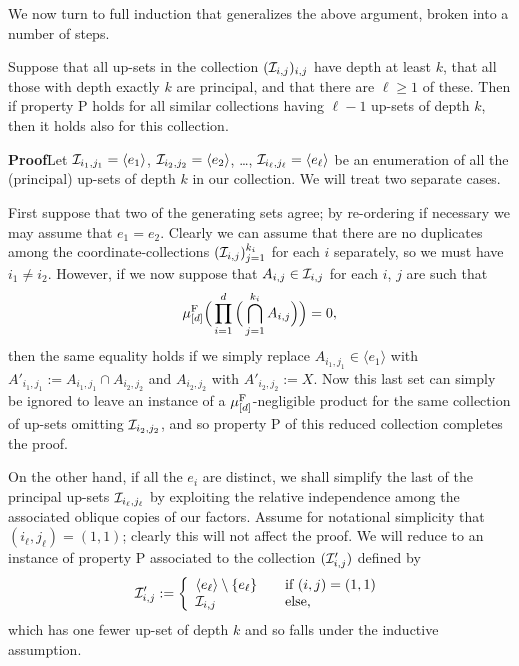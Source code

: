 \documentclass[12pt]{article}
\begin{document}
We now turn to full induction that generalizes the above argument,
broken into a number of steps.

\begin{lem}\label{lem:lift-rel-ind}
Suppose that all up-sets in the collection $(\I_{i,j})_{i,j}$ have
depth at least $k$, that all those with depth exactly $k$ are
principal, and that there are $\ell \geq 1$ of these.  Then if
property P holds for all similar collections having $\ell - 1$
up-sets of depth $k$, then it holds also for this collection.
\end{lem}

\textbf{Proof}\quad Let $\I_{i_1,j_1} = \langle e_1\rangle$,
$\I_{i_2,j_2} = \langle e_2\rangle$, \ldots, $\I_{i_\ell,j_\ell} =
\langle e_\ell\rangle$ be an enumeration of all the (principal)
up-sets of depth $k$ in our collection.  We will treat two separate
cases.

First suppose that two of the generating sets agree; by re-ordering
if necessary we may assume that $e_1 = e_2$.  Clearly we can assume
that there are no duplicates among the coordinate-collections
$(\I_{i,j})_{j=1}^{k_i}$ for each $i$ separately, so we must have
$i_1 \neq i_2$. However, if we now suppose that $A_{i,j}\in
\I_{i,j}$ for each $i$, $j$ are such that
\[\mu^{\rm{F}}_{[d]}\Big(\prod_{i=1}^d\Big(\bigcap_{j=1}^{k_i}A_{i,j}\Big)\Big) = 0,\]
then the same equality holds if we simply replace $A_{i_1,j_1} \in
\langle e_1\rangle$ with $A'_{i_1,j_1}:= A_{i_1,j_1}\cap
A_{i_2,j_2}$ and $A_{i_2,j_2}$ with $A'_{i_2,j_2} := X$. Now this
last set can simply be ignored to leave an instance of a
$\mu^{\rm{F}}_{[d]}$-negligible product for the same collection of
up-sets omitting $\I_{i_2,j_2}$, and so property P of this reduced
collection completes the proof.

On the other hand, if all the $e_i$ are distinct, we shall simplify
the last of the principal up-sets $\I_{i_\ell,j_\ell}$ by exploiting
the relative independence among the associated oblique copies of our
factors. Assume for notational simplicity that $(i_\ell,j_\ell) =
(1,1)$; clearly this will not affect the proof.  We will reduce to
an instance of property P associated to the collection $(\I'_{i,j})$
defined by
\[\I'_{i,j} := \left\{\begin{array}{ll}\langle e_\ell\rangle\setminus\{e_\ell\}&\quad\hbox{if}\ (i,j) = (1,1)\\ \I_{i,j}&\quad\hbox{else,}\end{array}\right.\]
which has one fewer up-set of depth $k$ and so falls under the
inductive assumption.
\end{document}
